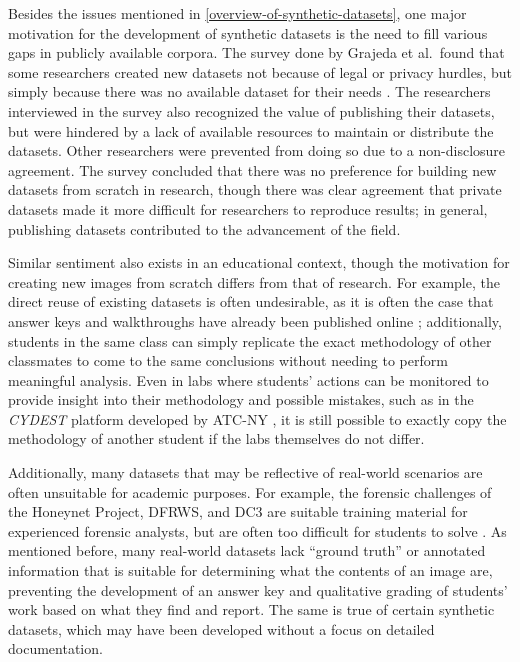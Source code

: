 Besides the issues mentioned in \ref{overview-of-synthetic-datasets}, one major motivation for the development of synthetic
datasets is the need to fill various gaps in publicly available corpora.
The survey done by Grajeda et al.~found that some researchers created
new datasets not because of legal or privacy hurdles, but simply because
there was no available dataset for their needs
\cite{grajedaAvailabilityDatasetsDigital2017}. The researchers
interviewed in the survey also recognized the value of publishing their
datasets, but were hindered by a lack of available resources to maintain
or distribute the datasets. Other researchers were prevented from doing
so due to a non-disclosure agreement. The survey concluded that there
was no preference for building new datasets from scratch in research,
though there was clear agreement that private datasets made it more
difficult for researchers to reproduce results; in general, publishing
datasets contributed to the advancement of the field.

Similar sentiment also exists in an educational context, though the
motivation for creating new images from scratch differs from that of
research. For example, the direct reuse of existing datasets is often
undesirable, as it is often the case that answer keys and walkthroughs
have already been published online
\cite{woodsCreatingRealisticCorpora2011}; additionally, students in
the same class can simply replicate the exact methodology of other
classmates to come to the same conclusions without needing to perform
meaningful analysis. Even in labs where students' actions can be
monitored to provide insight into their methodology and possible
mistakes, such as in the \emph{CYDEST} platform developed by ATC-NY
\cite{bruecknerAutomatedComputerForensics2008}, it is still possible
to exactly copy the methodology of another student if the labs
themselves do not differ.

Additionally, many datasets that may be reflective of real-world
scenarios are often unsuitable for academic purposes. For example, the
forensic challenges of the Honeynet Project, DFRWS, and DC3 are suitable
training material for experienced forensic analysts, but are often too
difficult for students to solve
\cite{woodsCreatingRealisticCorpora2011}. As mentioned before, many
real-world datasets lack ``ground truth'' or annotated information that
is suitable for determining what the contents of an image are,
preventing the development of an answer key and qualitative grading of
students' work based on what they find and report. The same is true of
certain synthetic datasets, which may have been developed without a
focus on detailed documentation.

